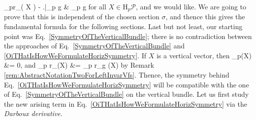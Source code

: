 \documentclass[a4paper,oneside,11pt,bibliography=totoc]{scrartcl}
\makeatletter
\def\oversortoftilde#1{\mathop{\vbox{\m@th\ialign{##\crcr\noalign{\kern3\p@}%
      \sortoftildefill\crcr\noalign{\kern3\p@\nointerlineskip}%
      $\hfil\displaystyle{#1}\hfil$\crcr}}}\limits}
\def\sortoftildefill{$\m@th \setbox\z@\hbox{$\braceld$}%
  \braceld\leaders\vrule \@height\ht\z@ \@depth\z@\hfill\braceru$}
\def\bas#1\eas{\begin{align*}#1\end{align*}}
\theoremstyle{plain}
\theoremstyle{remark}
\theoremstyle{definition}
\makeatother
\begin{document}
_pr_\sigma\mleft( 
	X 
\mright)
	- \mleft.{\oversortoftilde{
		\mleft( \mu_{\mathcal{G}}^{\mathrm{tot}}\mright)_g \bigl(
		\mathrm{D}_p (\sigma \circ \pi)(X)
	\bigr)
	}}\mright|_{p \cdot g}
&\in
{}_{p \cdot g}
\ea
for all $X \in \mathrm{H}_p\mathcal{P}$, and we would like. We are going to prove that this is independent of the chosen section $\sigma$, and thence this gives the fundamental formula for the following sections. Last but not least, our starting point was Eq.\ \eqref{SymmetryOfTheVerticalBundle}; there is no contradiction between the approaches of Eq.\ \eqref{SymmetryOfTheVerticalBundle} and \eqref{OiTHatIsHowWeFormulateHorizSymmetry}. If $X$ is a vertical vector, then
\bas
\mathrm{D}_p\pi(X) &= 0,
\eas
and
\bas
\mathrm{D}_p r_\sigma (X)
&=
_p r_g (X)
\eas
by Remark \ref{rem:AbstractNotationTwoForLeftInvarVfs}. Thence, the symmetry behind Eq.\ \eqref{OiTHatIsHowWeFormulateHorizSymmetry} will be compatible with the one of Eq.\ \eqref{SymmetryOfTheVerticalBundle} on the vertical bundle. Let us first study the new arising term in Eq.\ \eqref{OiTHatIsHowWeFormulateHorizSymmetry} via the \textit{Darboux derivative}.
\end{document}
